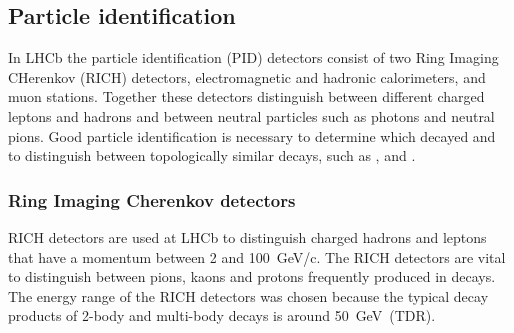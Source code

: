 \subsection{Particle identification}
\label{PID}

In LHCb the particle identification (PID) detectors consist of two Ring Imaging CHerenkov (RICH) detectors, electromagnetic and hadronic calorimeters, and muon stations. Together these detectors distinguish between different charged leptons and hadrons and between neutral particles such as photons and neutral pions. Good particle identification is necessary to determine which \bhadron decayed and to distinguish between topologically similar decays, such as \bdkpi, \bskk and \bmumu. %



\subsubsection{Ring Imaging Cherenkov detectors}
\label{RICH}

RICH detectors are used at LHCb to distinguish charged hadrons and leptons that have a momentum between 2 and 100~GeV/c. The RICH detectors are vital to distinguish between pions, kaons and protons frequently produced in \bhadron decays. %
The energy range of the RICH detectors was chosen because the typical decay products of 2-body and multi-body \bhadron decays is around 50~GeV~\cite{}(TDR). 



